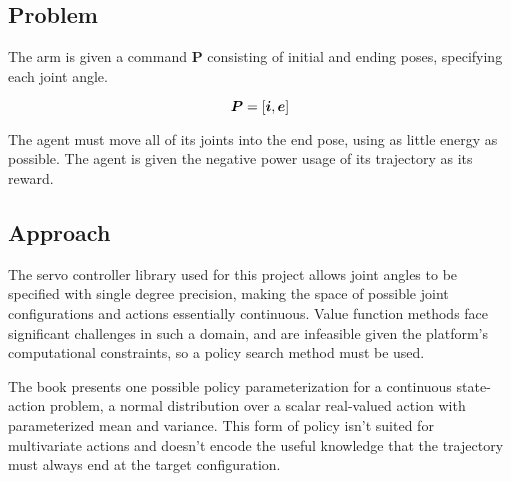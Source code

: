 \documentclass{article}
\newcommand{\bP}{\bm{P}}
\newcommand{\be}{\bm{e}}
\begin{document}
\subsection{Problem}

The arm is given a command $\bP$ consisting of initial and ending poses, specifying each joint angle.

\begin{equation}
	\bP = [\bm{i}, \be]\\
\end{equation}

The agent must move all of its joints into the end pose, using as little energy as possible. The agent is given the negative power usage of its trajectory as its reward.


\subsection{Approach}

The servo controller library used for this project allows joint angles to be specified with single degree precision, making the space of possible joint configurations and actions essentially continuous. Value function methods face significant challenges in such a domain, and are infeasible given the platform's computational constraints, so a policy search method must be used.

The book presents one possible policy parameterization for a continuous state-action problem, a normal distribution over a scalar real-valued action with parameterized mean and variance. This form of policy isn't suited for multivariate actions and doesn't encode the useful knowledge that the trajectory must always end at the target configuration.
\end{document}
